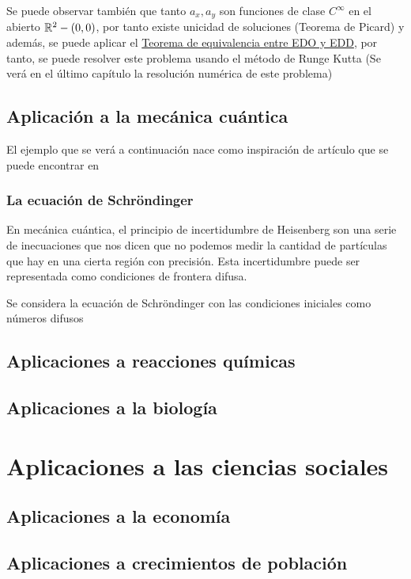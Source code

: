 \begin{ejemplo}
	Se puede observar también que tanto $a_x, a_y$ son funciones de clase $C^\infty$ en el abierto $\mathbb R^2 - (0, 0)$, por tanto existe unicidad de soluciones (Teorema de Picard) y además, se puede aplicar el \hyperref[teorema:equivalencia]{Teorema de equivalencia entre EDO y EDD}, por tanto, se puede resolver este problema usando el método de Runge Kutta (Se verá en el último capítulo la resolución numérica de este problema)
	
\end{ejemplo}

\subsection{Aplicación a la mecánica cuántica}
El ejemplo que se verá a continuación nace como inspiración de artículo que se puede encontrar en \cite{schrondinger}
\subsubsection{La ecuación de Schröndinger}
En mecánica cuántica, el principio de incertidumbre de Heisenberg son una serie de inecuaciones que nos dicen que no podemos medir la cantidad de partículas que hay en una cierta región con precisión. Esta incertidumbre puede ser representada como condiciones de frontera difusa. 

\begin{ejemplo}
	Se considera la ecuación de Schröndinger con las condiciones iniciales como números difusos
\end{ejemplo}
\subsection{Aplicaciones a reacciones químicas}
\subsection{Aplicaciones a la biología}

\section{Aplicaciones a las ciencias sociales}

\subsection{Aplicaciones a la economía}

\subsection{Aplicaciones a crecimientos de población}